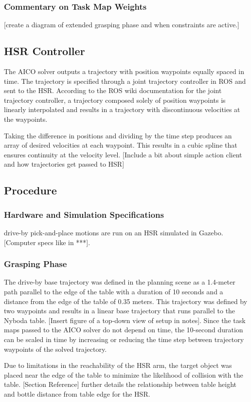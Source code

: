 \documentclass[12pt]{article}
\begin{document}
            \subsubsection{Commentary on Task Map Weights}
                [create a diagram of extended grasping phase and when constraints are active.]
        \subsection{HSR Controller}
            The AICO solver outputs a trajectory with position waypoints equally spaced in time. The trajectory is specified through a joint trajectory controller in ROS and sent to the HSR. According to the ROS wiki documentation for the joint trajectory controller, a trajectory composed solely of position waypoints is linearly interpolated and results in a trajectory with discontinuous velocities at the waypoints. 
            \par Taking the difference in positions and dividing by the time step produces an array of desired velocities at each waypoint. This results in a cubic spline that ensures continuity at the velocity level.
            [Include a bit about simple action client and how trajectories get passed to HSR]
        \subsection{Procedure}
            \subsubsection{Hardware and Simulation Specifications}
                drive-by pick-and-place motions are run on an HSR simulated in Gazebo. [Computer specs like in ***].
                
            \subsubsection{Grasping Phase}
                The drive-by base trajectory was defined in the planning scene as a 1.4-meter path parallel to the edge of the table with a duration of 10 seconds and a distance from the edge of the table of 0.35 meters. This trajectory was defined by two waypoints and results in a linear base trajectory that runs parallel to the Nyboda table. [Insert figure of a top-down view of setup in notes]. Since the task maps passed to the AICO solver do not depend on time, the 10-second duration can be scaled in time by increasing or reducing the time step between trajectory waypoints of the solved trajectory.
                \par Due to limitations in the reachability of the HSR arm, the target object was placed near the edge of the table to minimize the likelihood of collision with the table. [Section Reference] further details the relationship between table height and bottle distance from table edge for the HSR.
\end{document}
